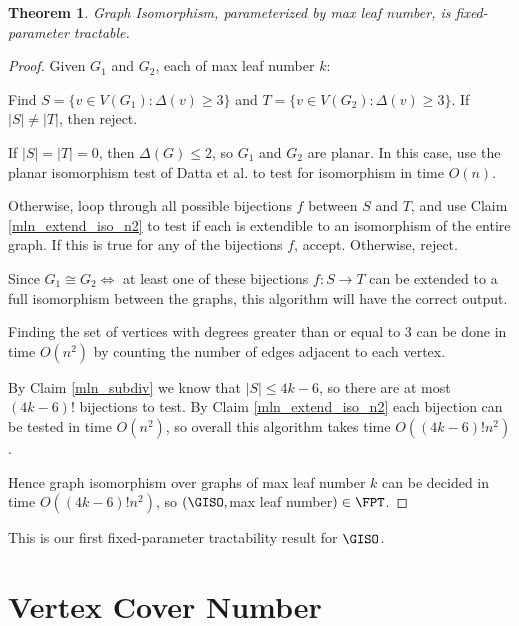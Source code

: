 \documentclass[11pt]{report}
\newtheorem{thm}{Theorem}
\begin{document}
\begin{thm} Graph Isomorphism, parameterized by max leaf number, is fixed-parameter tractable.
\label{thm:mln_fpt}
\end{thm}
\begin{proof}

Given $G_1$ and $G_2$, each of max leaf number $k$:

Find $S=\{v\in V(G_1): \Delta(v)\geq 3\}$ and $T=\{v\in V(G_2):\Delta(v) \geq 3\}$. If $|S| \neq |T|$, then reject.

If $|S|=|T|=0$, then $\Delta(G)\leq 2$, so $G_1$ and $G_2$ are planar. In this case, use the planar isomorphism test of Datta et al. \cite{Datta09} to test for isomorphism in time $O(n)$.

Otherwise, loop through all possible bijections $f$ between $S$ and $T$, and use Claim \ref{mln_extend_iso_n2} to test if each is extendible to an isomorphism of the entire graph. If this is true for any of the bijections $f$, accept. Otherwise, reject.


Since $G_1\cong G_2 \Leftrightarrow$ at least one of these bijections $f:S\rightarrow T$ can be extended to a full isomorphism between the graphs, this algorithm will have the correct output.

Finding the set of vertices with degrees greater than or equal to 3 can be done in time $O(n^2)$ by counting the number of edges adjacent to each vertex. 

By Claim \ref{mln_subdiv} we know that $|S|\leq 4k-6$, so there are at most $(4k-6)!$ bijections to test. By Claim \ref{mln_extend_iso_n2} each bijection can be tested in time $O(n^2)$, so overall this algorithm takes time $O((4k-6)!n^2)$.

Hence graph isomorphism over graphs of max leaf number $k$ can be decided in time $O((4k-6)!n^2)$, so $(\GISO, $max leaf number$)\in \FPT$.






\end{proof}


This is our first fixed-parameter tractability result for $\GISO$.










\section{Vertex Cover Number}
\end{document}
